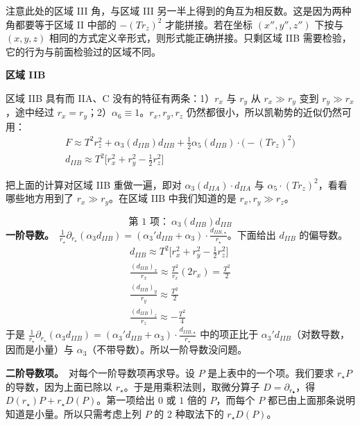 注意此处的区域 III 角，与区域 III 另一半上得到的角互为相反数。这是因为两种角都要等于区域 II 中部的 $-(Tr_z)^2$ 才能拼接。若在坐标 $(x'',y'',z'')$ 下按与 $(x,y,z)$ 相同的方式定义辛形式，则形式能正确拼接。只剩区域 IIB 需要检验，它的行为与前面检验过的区域不同。

\medskip
\noindent\textbf{区域 IIB}\par
区域 IIB 具有而 IIA、C 没有的特征有两条：1）$r_x$ 与 $r_y$ 从 $r_x\gg r_y$ 变到 $r_y\gg r_x$，途中经过 $r_x=r_y$；2）$\alpha_6\equiv1$。$r_x,r_y,r_z$ 仍然都很小，所以凯勒势的近似仍然可用：
\begin{gather*}
F\approx T^2r_z^2+\alpha_3(d_{IIB})d_{IIB}+\frac12\alpha_5(d_{IIB})\cdot\big(-(Tr_z)^2\big)\\
d_{IIB}\approx T^2\Big[r_x^2+r_y^2-\frac12r_z^2\Big]
\end{gather*}

把上面的计算对区域 IIB 重做一遍，即对 $\alpha_3(d_{IIA})\cdot d_{IIA}$ 与 $\alpha_5\cdot(Tr_z)^2$，看看哪些地方用到了 $r_x\gg r_y$。在区域 IIB 中我们知道的是 $r_x,r_y\gg r_z$。

\[
\text{第 1 项：}\ \alpha_3(d_{IIB})d_{IIB}
\]
\noindent\textbf{一阶导数。}\ $\frac{1}{r_\star}\partial_{r_\star}(\alpha_3d_{IIB})=(\alpha_3'd_{IIB}+\alpha_3)\cdot\frac{d_{IIB,\star}}{r_\star}$。下面给出 $d_{IIB}$ 的偏导数。
\begin{gather*}
d_{IIB}\approx T^2\Big[r_x^2+r_y^2-\frac12r_z^2\Big]\\
\frac{(d_{IIB})_x}{r_x}\approx\frac{T^2}{r_x}(2r_x)=\frac{T^2}{2}\\
\frac{(d_{IIB})_y}{r_y}\approx\frac{T^2}{2}\\
\frac{(d_{IIB})_z}{r_z}\approx-\frac{T^2}{4}
\end{gather*}
于是 $\frac{1}{r_\star}\partial_{r_\star}(\alpha_3d_{IIB})=(\alpha_3'd_{IIB}+\alpha_3)\cdot\frac{d_{IIB,\star}}{r_\star}$ 中的项正比于 $\alpha_3'd_{IIB}$（对数导数，因而是小量）与 $\alpha_3$（不带导数）。所以一阶导数没问题。

\noindent\textbf{二阶导数项。}\ 对每个一阶导数项再求导。设 $P$ 是上表中的一个项。我们要求 $r_\star P$ 的导数，因为上面已除以 $r_\star$。于是用乘积法则，取微分算子 $D=\partial_{r_\bullet}$，得 $D(r_\star)P+r_\star D(P)$。第一项给出 $0$ 或 $1$ 倍的 $P$，而每个 $P$ 都已由上面那条说明知道是小量。所以只需考虑上列 $P$ 的 2 种取法下的 $r_\star D(P)$。

